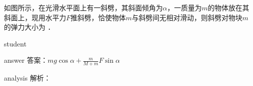 \begin{example}
	如图所示，在光滑水平面上有一斜劈，其斜面倾角为$ \alpha $，一质量为$ m $的物体放在其斜面上，现用水平力$ F $推斜劈，恰使物体$ m $与斜劈间无相对滑动，则斜劈对物块$ m $的弹力大小为              ．
	
	\begin{taggedblock}{student}
		\vspace*{1cm}
	\end{taggedblock}
	
	
	\begin{taggedblock}{answer}
		答案：$ mg\cos\alpha+\frac{m}{M+m}F\sin\alpha $
	\end{taggedblock}
	
	
	\begin{taggedblock}{analysis}
		解析：
	\end{taggedblock}
\end{example}



